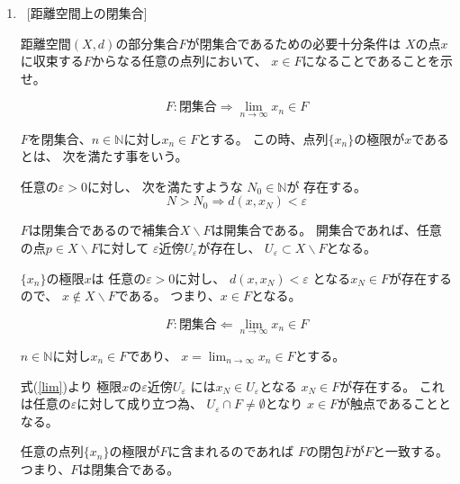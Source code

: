 \documentclass[12pt,b5paper]{ltjsarticle}
\begin{document}
\begin{enumerate}
 \item
      \
      [距離空間上の閉集合]

      距離空間$(X,d)$の部分集合$F$が閉集合であるための必要十分条件は
      $X$の点$x$に収束する$F$からなる任意の点列において、
      $x\in F$になることであることを示せ。

      \dotfill

      \begin{equation}
       F:\text{閉集合}
        \Rightarrow
        \lim_{n\to \infty}x_n \in F
      \end{equation}

      $F$を閉集合、$n\in\mathbb{N}$に対し$x_n\in F$とする。
      この時、点列$\{x_n\}$の極限が$x$であるとは、
      次を満たす事をいう。
      \begin{center}
       任意の$\varepsilon>0$に対し、
       次を満たすような
       $N_0\in\mathbb{N}$が
       存在する。
       \begin{equation}
        N>N_0 \Rightarrow d(x,x_N) <\varepsilon
         \label{lim}
       \end{equation}
      \end{center}


      $F$は閉集合であるので補集合$X\backslash F$は開集合である。
      開集合であれば、任意の点$p\in X\backslash F$に対して
      $\varepsilon$近傍$U_{\varepsilon}$が存在し、
      $U_{\varepsilon}\subset X\backslash F$となる。

      $\{x_n\}$の極限$x$は
      任意の$\varepsilon>0$に対し、
      $d(x,x_N)<\varepsilon$
      となる$x_N\in F$が存在するので、
      $x\not\in X\backslash F$である。
      つまり、$x\in F$となる。


      \begin{equation}
       F:\text{閉集合}
        \Leftarrow
        \lim_{n\to \infty}x_n \in F
      \end{equation}

      $n\in\mathbb{N}$に対し$x_n\in F$であり、
      $\displaystyle x=\lim_{n\to\infty}x_n\in F$とする。

      式(\ref{lim})より
      極限$x$の$\varepsilon$近傍$U_{\varepsilon}$
      には$x_{N}\in U_{\varepsilon}$となる
      $x_{N}\in F$が存在する。
      これは任意の$\varepsilon$に対して成り立つ為、
      $U_{\varepsilon}\cap F\ne\emptyset$となり
      $x\in F$が触点であることとなる。

      任意の点列$\{x_n\}$の極限が$F$に含まれるのであれば
      $F$の閉包$\bar{F}$が$F$と一致する。
      つまり、$F$は閉集合である。



\end{enumerate}
\end{document}

